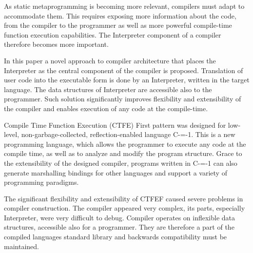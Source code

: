 As static metaprogramming is becoming more relevant, compilers must adapt to accommodate them. This requires exposing more information about the code, from the compiler to the programmer as well as more powerful compile-time function execution capabilities. The Interpreter component of a compiler therefore becomes more important.

In this paper a novel approach to compiler architecture that places the Interpreter as the central component of the compiler is proposed.
Translation of user code into the executable form is done by an Interpreter, written in the target language. The data structures of Interpreter are accessible also to the programmer. Such solution significantly improves flexibility and extensibility of the compiler and enables execution of any code at the compile-time.

Compile Time Function Execution (CTFE) First pattern was designed for low-level, non-garbage-collected, reflection-enabled language C-=-1. This is a new programming language, which allows the programmer to execute any code at the compile time, as well as to analyze and modify the program structure. Grace to the extensibility of the designed compiler, programs written in C-=-1 can also generate marshalling bindings for other languages and support a variety of programming paradigms.

The significant flexibility and extensibility of CTFEF caused severe problems in compiler construction. The compiler appeared very complex, its parts, especially Interpreter, were very difficult to debug. Compiler operates on inflexible data structures, accessible also for a programmer. They are therefore a part of the compiled languages standard library and backwards compatibility must be maintained.
